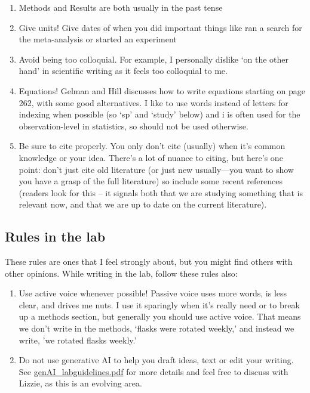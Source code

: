 \documentclass[11pt,letter]{article}
\begin{document}
\begin{enumerate}
\item Methods and Results are both usually in the past tense
\item Give units! Give dates of when you did important things like ran a search for the meta-analysis or started an experiment
\item Avoid being too colloquial. For example, I personally dislike `on the other hand' in scientific writing as it feels too colloquial to me. 
\item Equations! Gelman and Hill discusses how to write equations starting on page 262, with some good alternatives. I like to use words instead of letters for indexing when possible (so `sp' and `study' below) and i is often used for the observation-level in statistics, so should not be used otherwise. 
\item Be sure to cite properly. You only don't cite (usually) when it's common knowledge or your idea. There's a lot of nuance to citing, but here's one point: don't just cite old literature (or just new usually---you want to show you have a grasp of the full literature) so include some recent references (readers look for this -- it signals both that we are studying something that is relevant now, and that we are up to date on the current literature).
\end{enumerate}

\subsection{Rules in the lab}

These rules are ones that I feel strongly about, but you might find others with other opinions. While writing in the lab, follow these rules also:
\begin{enumerate}
\item Use active voice whenever possible! Passive voice uses more words, is less clear, and drives me nuts. I use it sparingly when it's really need or to break up a methods section, but generally you should use active voice. That means we don't write in the methods, `flasks were rotated weekly,' and instead we write, 'we rotated flasks weekly.'
\item Do not use generative AI to help you draft ideas, text or edit your writing. See \href{https://github.com/temporalecologylab/labgit/blob/master/expectations/writing/genAI_labguidelines.pdf}{genAI\_labguidelines.pdf} for more details and feel free to discuss with Lizzie, as this is an evolving area. 
\end{enumerate}
\end{document}
